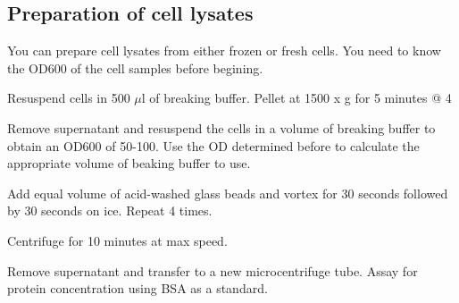 	\subsection{Preparation of cell lysates}
	\begin{packed_enum}
		\item You can prepare cell lysates from  either frozen or fresh cells. You need to know the OD{\scriptsize600} of the cell samples before begining.
		\item Resuspend cells in 500 $\mu$l of breaking buffer. Pellet at 1500 x g for 5 minutes @ 4\textcelsius
		\item Remove supernatant and resuspend the cells in a volume of breaking buffer to obtain an OD{\scriptsize 600} of 50-100. Use the OD determined before to calculate the appropriate volume of beaking buffer to use.
		\item Add equal volume of acid-washed glass beads and vortex for 30 seconds followed by 30 seconds on ice. Repeat 4 times.
		\item Centrifuge for 10 minutes at max speed.
		\item Remove supernatant and transfer to a new microcentrifuge tube. Assay for protein concentration using BSA as a standard.
		
	\end{packed_enum}

